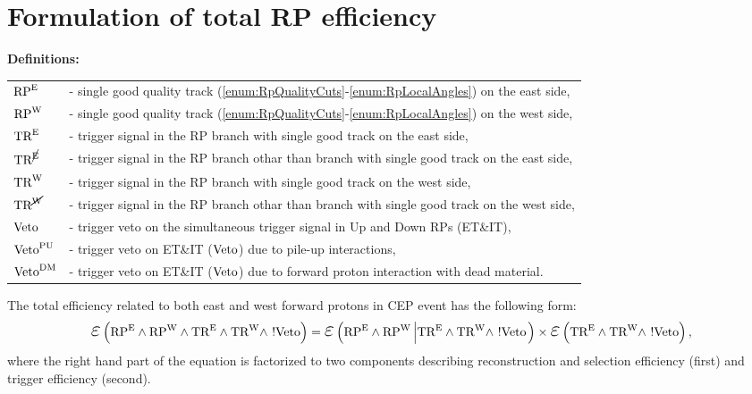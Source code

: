 
\chapter{Formulation of total RP efficiency}\label{appendix:totalRpEffFormulation}


\textbf{Definitions:}\\[7pt]
\begin{tabular}{ll}
$\text{RP}^{\text{E}}$ &- single good quality track (\ref{enum:RpQualityCuts}-\ref{enum:RpLocalAngles}) on the east side,\\
$\text{RP}^{\text{W}}$ & - single good quality track (\ref{enum:RpQualityCuts}-\ref{enum:RpLocalAngles}) on the west side,\\
$\text{TR}^{\text{E}}$ & - trigger signal in the RP branch with single good track on the east side,\\
$\text{TR}^{\cancel{\text{E}}}$ & - trigger signal in the RP branch othar than branch with single good track on the east side,\\
$\text{TR}^{\text{W}}$ & - trigger signal in the RP branch with single good track on the west side,\\
$\text{TR}^{\cancel{\text{W}}}$ & - trigger signal in the RP branch othar than branch with single good track on the west side,\\
$\text{Veto}$ & - trigger veto on the simultaneous trigger signal in Up and Down RPs (ET\&IT),\\
$\text{Veto}^{\text{PU}}$ & - trigger veto on ET\&IT ($\text{Veto}$) due to pile-up interactions,\\
$\text{Veto}^{\text{DM}}$ & - trigger veto on ET\&IT ($\text{Veto}$) due to forward proton interaction with dead material.\\ 
\end{tabular}\vspace{10pt}


The total efficiency related to both east and west forward protons in CEP event has the following form:
\begin{equation}
\mbox{\LARGE$\varepsilon$}\left(\RPE\land\RPW\land\TRE\land\TRW\land~!\V\right) = \mbox{\LARGE$\varepsilon$}\left(\RPE\land\RPW\left|\TRE\land\TRW\land~!\V\right.\right)\times\mbox{\LARGE$\varepsilon$}\left(\TRE\land\TRW\land~!\V\right),
\end{equation}
where the right hand part of the equation is factorized to two components describing reconstruction and selection efficiency (first) and trigger efficiency (second).


